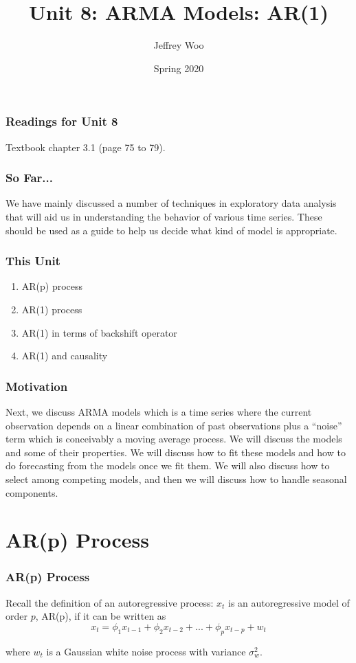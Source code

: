 \documentclass[%
xcolor=pdftex]{beamer}
\title{Unit 8: ARMA Models: AR(1)}
\author[STAT 5170: Applied Time Series, Unit 8]{Jeffrey Woo}
\institute{Department of Statistics, University of Virginia}
\date{Spring 2020}
\begin{document}
\frame{\titlepage}


\begin{frame}
\frametitle{Readings for Unit 8}

Textbook chapter 3.1 (page 75 to 79).

\end{frame}


\begin{frame}
\frametitle{So Far...}

We have mainly discussed a number of techniques in exploratory data analysis that will aid us in understanding the behavior of various time series. These should be used as a guide to help us decide what kind of model is appropriate.

\end{frame}

\begin{frame}
\frametitle{This Unit}
\begin{enumerate}
\item AR(p) process
\item AR(1) process
\item AR(1) in terms of backshift operator
\item AR(1) and causality
\end{enumerate}
\end{frame}

\begin{frame}
\frametitle{Motivation}

Next, we discuss ARMA models which is a time series where the current observation depends on a linear combination of past observations plus  a ``noise'' term which is conceivably a moving average process.  We will discuss the models and some of their properties.  We will discuss how to fit these models and how to do forecasting from the models once we fit them.  We will also discuss how to select among competing models, and then we will discuss how to handle seasonal components.

\end{frame}

\section{AR(p) Process}
\frame{\tableofcontents[currentsection]}

\begin{frame}
\frametitle{AR(p) Process}

Recall the definition of an autoregressive
process: $x_t$ is an autoregressive model of order $p$, AR(p), if it can be written as
\begin{equation} \label{eq:ar1}
x_t =\phi_1 x_{t-1} + \phi_2 x_{t-2} +...+  \phi_p x_{t-p} + w_t
\end{equation}

where $w_t$ is a Gaussian white noise process with variance $\sigma_w^2$.
\end{frame}
\end{document}
